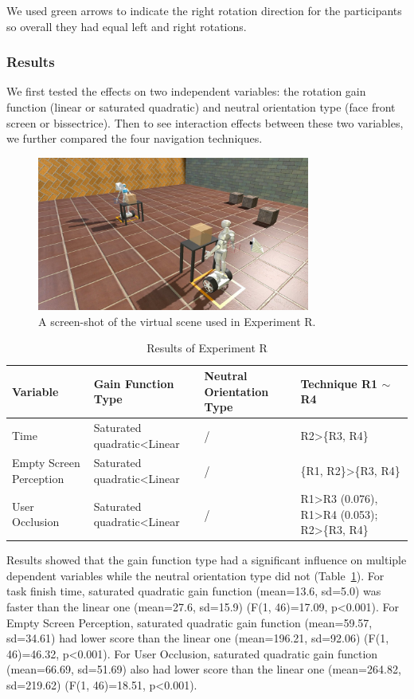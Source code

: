 We used green arrows to indicate the right rotation direction for the participants so overall they had equal left and right rotations.

\subsubsection{Results}
We first tested the effects on two independent variables: the rotation gain function (linear or saturated quadratic) and neutral orientation type (face front screen or bissectrice). Then to see interaction effects between these two variables, we further compared the four navigation techniques.

\begin{figure}[tb]
  \centering
  \includegraphics[width=0.8\textwidth]{figures/ch4/t2}
  \caption{\label{fig:4_task2}A screen-shot of the virtual scene used in Experiment R.}
\end{figure}

\begin{table}[!t]
\renewcommand{\arraystretch}{1.3}
\caption{Results of Experiment R}
\label{tab:4_result_t2}
\centering
\begin{tabular}{l l l l}
  \hline
  Variable & Gain Function Type & Neutral Orientation Type & Technique R1 $\sim$ R4 \\
  \hline
  Time & Saturated quadratic\textless Linear & / & R2\textgreater \{R3, R4\} \\
  Empty Screen Perception & Saturated quadratic\textless Linear & / & \{R1, R2\}\textgreater\{R3, R4\} \\
  User Occlusion & Saturated quadratic\textless Linear & / & R1\textgreater R3 (0.076), R1\textgreater R4 (0.053); R2\textgreater \{R3, R4\} \\
  \hline
\end{tabular}
\end{table}

Results showed that the gain function type had a significant influence on multiple dependent variables while the neutral orientation type did not (Table~\ref{tab:4_result_t2}). For task finish time, saturated quadratic gain function (mean=13.6, sd=5.0) was faster than the linear one (mean=27.6, sd=15.9) (F(1, 46)=17.09, p\textless 0.001). For Empty Screen Perception, saturated quadratic gain function (mean=59.57, sd=34.61) had lower score than the linear one (mean=196.21, sd=92.06) (F(1, 46)=46.32, p\textless 0.001). For User Occlusion, saturated quadratic gain function (mean=66.69, sd=51.69) also had lower score than the linear one (mean=264.82, sd=219.62) (F(1, 46)=18.51, p\textless 0.001).


